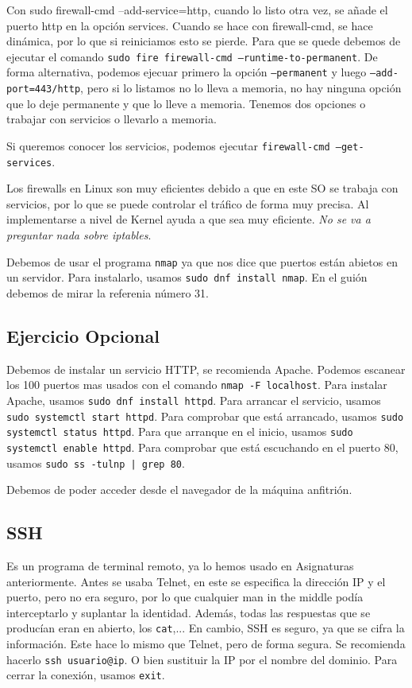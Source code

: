Con sudo firewall-cmd --add-service=http, cuando lo listo otra vez, se añade el puerto http en la opción services. Cuando se hace con firewall-cmd, se hace dinámica, por lo que si reiniciamos esto se pierde. Para que se quede debemos de ejecutar el comando \texttt{sudo fire firewall-cmd --runtime-to-permanent}. De forma alternativa, podemos ejecuar primero la opción \texttt{--permanent} y luego \texttt{--add-port=443/http}, pero si lo listamos no lo lleva a memoria, no hay ninguna opción que lo deje permanente y que lo lleve a memoria. Tenemos dos opciones o trabajar con servicios o llevarlo a memoria.

Si queremos conocer los servicios, podemos ejecutar \texttt{firewall-cmd --get-services}.

Los firewalls en Linux son muy eficientes debido a que en este SO se trabaja con servicios, por lo que se puede controlar el tráfico de forma muy precisa. Al implementarse a nivel de Kernel ayuda a que sea muy eficiente.
\textit{No se va a preguntar nada sobre iptables}.

Debemos de usar el programa \texttt{nmap} ya que nos dice que puertos están abietos en un servidor. Para instalarlo, usamos \texttt{sudo dnf install nmap}. En el guión debemos de mirar la referenia número 31.

\subsection{Ejercicio Opcional}

Debemos de instalar un servicio HTTP, se recomienda Apache. Podemos escanear los 100 puertos mas usados con el comando \texttt{nmap -F localhost}. Para instalar Apache, usamos \texttt{sudo dnf install httpd}. Para arrancar el servicio, usamos \texttt{sudo systemctl start httpd}. Para comprobar que está arrancado, usamos \texttt{sudo systemctl status httpd}. Para que arranque en el inicio, usamos \texttt{sudo systemctl enable httpd}. Para comprobar que está escuchando en el puerto 80, usamos \texttt{sudo ss -tulnp | grep 80}.

Debemos de poder acceder desde el navegador de la máquina anfitrión.

\subsection{SSH}

Es un programa de terminal remoto, ya lo hemos usado en Asignaturas anteriormente. Antes se usaba Telnet, en este se especifica la dirección IP y el puerto, pero no era seguro, por lo que cualquier man in the middle podía interceptarlo y suplantar la identidad. Además, todas las respuestas que se producían eran en abierto, los \texttt{cat},... En cambio, SSH es seguro, ya que se cifra la información. Este hace lo mismo que Telnet, pero de forma segura. Se recomienda hacerlo \texttt{ssh usuario@ip}. O bien sustituir la IP por el nombre del dominio. Para cerrar la conexión, usamos \texttt{exit}. 


